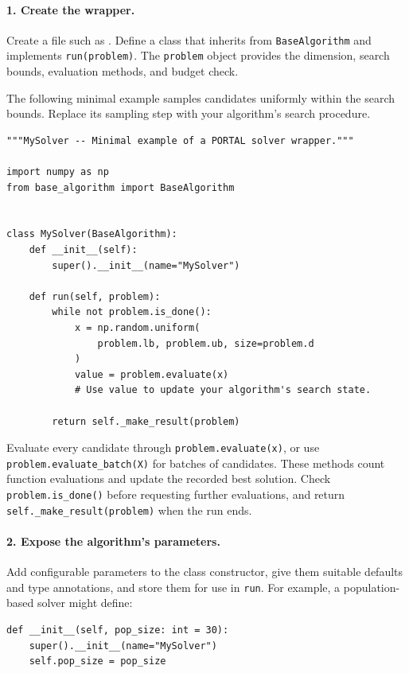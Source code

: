 \documentclass[journal,onecolumn]{IEEEtran}
\begin{document}
\paragraph{1. Create the wrapper.}
Create a file such as . Define a class that inherits from \texttt{BaseAlgorithm} and implements \texttt{run(problem)}. The \texttt{problem} object provides the dimension, search bounds, evaluation methods, and budget check.

\begin{samepage}
The following minimal example samples candidates uniformly within the search bounds. Replace its sampling step with your algorithm's search procedure.

\begin{verbatim}
"""MySolver -- Minimal example of a PORTAL solver wrapper."""

import numpy as np
from base_algorithm import BaseAlgorithm


class MySolver(BaseAlgorithm):
    def __init__(self):
        super().__init__(name="MySolver")

    def run(self, problem):
        while not problem.is_done():
            x = np.random.uniform(
                problem.lb, problem.ub, size=problem.d
            )
            value = problem.evaluate(x)
            # Use value to update your algorithm's search state.

        return self._make_result(problem)
\end{verbatim}
\end{samepage}

Evaluate every candidate through \texttt{problem.evaluate(x)}, or use \texttt{problem.evaluate\_batch(X)} for batches of candidates. These methods count function evaluations and update the recorded best solution. Check \texttt{problem.is\_done()} before requesting further evaluations, and return \texttt{self.\_make\_result(problem)} when the run ends.

\paragraph{2. Expose the algorithm's parameters.}
Add configurable parameters to the class constructor, give them suitable defaults and type annotations, and store them for use in \texttt{run}. For example, a population-based solver might define:

\begin{verbatim}
def __init__(self, pop_size: int = 30):
    super().__init__(name="MySolver")
    self.pop_size = pop_size
\end{verbatim}
\end{document}
